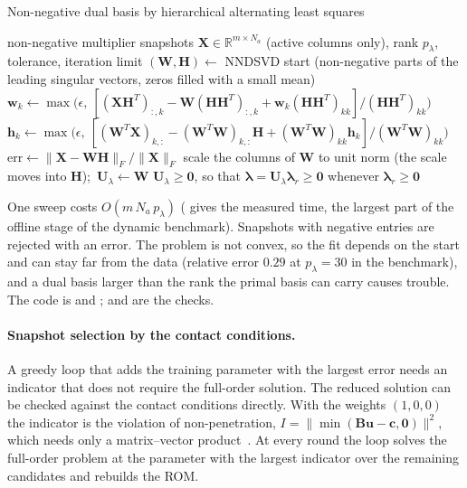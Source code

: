 \begin{algbox}{Non-negative dual basis by hierarchical alternating least squares}
\begin{pseudo}
\Require non-negative multiplier snapshots $\bm X\in\mathbb R^{m\times N_a}$ (active columns only), rank $p_\lambda$, tolerance, iteration limit
\State $(\bm W,\bm H)\gets$ NNDSVD start (non-negative parts of the leading singular vectors, zeros filled with a small mean)
\Repeat
    \State $\bm w_k\gets\max\!\big(\epsilon,\ [(\bm X\bm H^T)_{:,k}-\bm W(\bm H\bm H^T)_{:,k}+\bm w_k(\bm H\bm H^T)_{kk}]/(\bm H\bm H^T)_{kk}\big)$
  \EndFor
    \State $\bm h_k\gets\max\!\big(\epsilon,\ [(\bm W^T\bm X)_{k,:}-(\bm W^T\bm W)_{k,:}\bm H+(\bm W^T\bm W)_{kk}\bm h_k]/(\bm W^T\bm W)_{kk}\big)$
  \EndFor
  \State $\mathrm{err}\gets\|\bm X-\bm W\bm H\|_F/\|\bm X\|_F$
\State scale the columns of $\bm W$ to unit norm (the scale moves into $\bm H$);\ $\bm U_\lambda\gets\bm W$
\Ensure $\bm U_\lambda\ge\bm 0$, so that $\bm\lambda=\bm U_\lambda\bm\lambda_r\ge\bm0$ whenever $\bm\lambda_r\ge\bm0$
\end{pseudo}
\end{algbox}

One sweep costs $O(m\,N_a\,p_\lambda)$ ( gives the measured time, the largest part of the offline stage of the dynamic benchmark). Snapshots with negative entries are rejected with an error. The problem is not convex, so the fit depends on the start and can stay far from the data (relative error $0.29$ at $p_\lambda=30$ in the benchmark), and a dual basis larger than the rank the primal basis can carry causes trouble. The code is  and ;  and  are the checks.

\paragraph{Snapshot selection by the contact conditions.}
A greedy loop that adds the training parameter with the largest error needs an indicator that does not require the full-order solution. The reduced solution can be checked against the contact conditions directly. With the weights $(1,0,0)$ the indicator is the violation of non-penetration, $I=\|\min(\bm B\bm u-\bm c,\bm0)\|^2$, which needs only a matrix--vector product~\cite{balajewicz2016contact}. At every round the loop solves the full-order problem at the parameter with the largest indicator over the remaining candidates and rebuilds the ROM.

